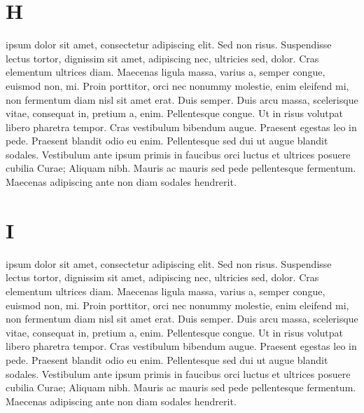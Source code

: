 \documentclass{article}
\begin{document}
\pend


\section{H}



\pstart
{}       ipsum dolor sit amet, consectetur adipiscing elit. Sed non risus. Suspendisse lectus tortor, dignissim sit amet, adipiscing nec, ultricies sed, dolor. Cras elementum ultrices diam. Maecenas ligula massa, varius a, semper congue, euismod non, mi. Proin porttitor, orci nec nonummy molestie, enim  eleifend mi, non fermentum diam nisl sit amet erat. Duis semper. Duis arcu massa, scelerisque vitae, consequat in, pretium a, enim. Pellentesque congue. Ut in risus volutpat libero pharetra tempor. Cras vestibulum bibendum augue. Praesent egestas leo in pede. Praesent blandit odio eu enim. Pellentesque sed dui ut augue blandit sodales. Vestibulum ante ipsum primis in faucibus orci luctus et ultrices posuere cubilia Curae; Aliquam nibh. Mauris ac mauris sed pede pellentesque fermentum. Maecenas adipiscing ante non diam sodales hendrerit. 

\pend



\section{I}



\pstart
{}       ipsum dolor sit amet, consectetur adipiscing elit. Sed non risus. Suspendisse lectus tortor, dignissim sit amet, adipiscing nec, ultricies sed, dolor. Cras elementum ultrices diam. Maecenas ligula massa, varius a, semper congue, euismod non, mi. Proin porttitor, orci nec nonummy molestie, enim  eleifend mi, non fermentum diam nisl sit amet erat. Duis semper. Duis arcu massa, scelerisque vitae, consequat in, pretium a, enim. Pellentesque congue. Ut in risus volutpat libero pharetra tempor. Cras vestibulum bibendum augue. Praesent egestas leo in pede. Praesent blandit odio eu enim. Pellentesque sed dui ut augue blandit sodales. Vestibulum ante ipsum primis in faucibus orci luctus et ultrices posuere cubilia Curae; Aliquam nibh. Mauris ac mauris sed pede pellentesque fermentum. Maecenas adipiscing ante non diam sodales hendrerit. 

\pend

\endnumbering
\end{document}

